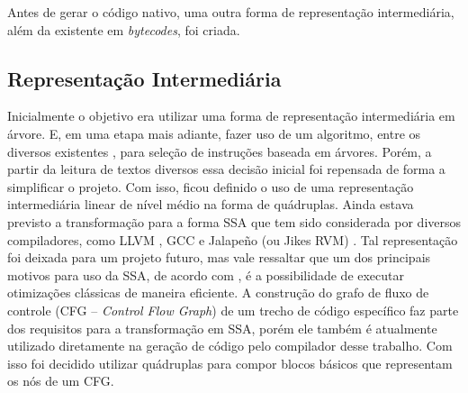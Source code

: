 
Antes de gerar o código nativo, uma outra forma de representação
intermediária, além da existente em \textit{bytecodes}, foi criada.





\subsection{Representação Intermediária}
\label{intermediate}

Inicialmente o objetivo era utilizar uma forma de representação
intermediária em árvore. E, em uma etapa mais adiante,
fazer uso de um algoritmo, entre os diversos existentes \cite{noltis,
  ir_tree_parsing, instrselec-dynamic}, para seleção
de instruções baseada em árvores. %
Porém, a partir da leitura de
textos diversos\cite{dragonbook, muchnick} essa decisão inicial foi repensada de forma a
simplificar o projeto.
Com isso, ficou definido o uso de uma representação intermediária
linear de nível médio na forma de quádruplas.
Ainda estava previsto a transformação para a forma SSA \cite{cytron} que
tem sido considerada por diversos compiladores, como LLVM
\cite{llvm1}, GCC \cite{gcc-ssa} e Jalapeño (ou Jikes RVM)
\cite{jalapeno_1}. Tal representação foi deixada para um projeto futuro,
mas vale ressaltar que um dos principais motivos para uso da SSA, de
acordo com , é a possibilidade de executar
otimizações clássicas de maneira eficiente.
A construção do grafo de fluxo de controle (CFG
-- \textit{Control Flow Graph}) \cite{muchnick} de um trecho de código específico faz
parte dos requisitos para a transformação em SSA, porém ele também é
atualmente utilizado diretamente na geração de código pelo compilador
desse trabalho. Com isso
foi decidido utilizar quádruplas para compor blocos
básicos que representam os nós de um CFG.

